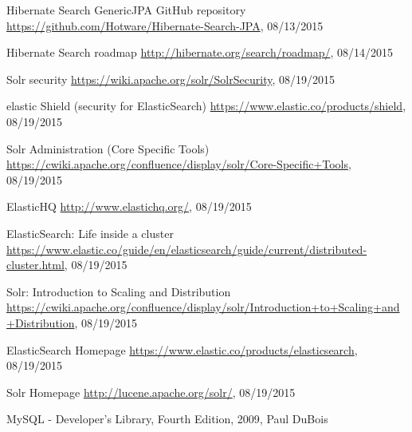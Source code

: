 \begin{thebibliography}{99}
	Hibernate Search GenericJPA GitHub repository
	\url{https://github.com/Hotware/Hibernate-Search-JPA}, 08/13/2015
	
	Hibernate Search roadmap
	\url{http://hibernate.org/search/roadmap/}, 08/14/2015
	
	Solr security
	\url{https://wiki.apache.org/solr/SolrSecurity}, 08/19/2015
	
	elastic Shield (security for ElasticSearch)
	\url{https://www.elastic.co/products/shield}, 08/19/2015
	
	Solr Administration (Core Specific Tools)
	\url{https://cwiki.apache.org/confluence/display/solr/Core-Specific+Tools}, 08/19/2015
	
	ElasticHQ
	\url{http://www.elastichq.org/}, 08/19/2015
	
	ElasticSearch: Life inside a cluster
	\url{https://www.elastic.co/guide/en/elasticsearch/guide/current/distributed-cluster.html}, 08/19/2015
	
	Solr: Introduction to Scaling and Distribution
	\url{https://cwiki.apache.org/confluence/display/solr/Introduction+to+Scaling+and+Distribution}, 08/19/2015
	
	ElasticSearch Homepage
	\url{https://www.elastic.co/products/elasticsearch}, 08/19/2015
	
	Solr Homepage
	\url{http://lucene.apache.org/solr/}, 08/19/2015
	
	MySQL - Developer's Library, Fourth Edition, 2009, Paul DuBois
\end{thebibliography}